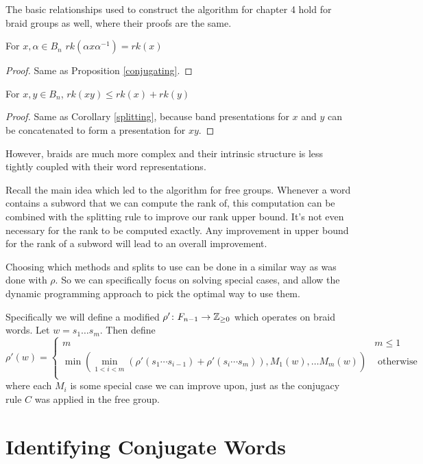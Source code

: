 \documentclass[12pt]{thesis}
\begin{document}
The basic relationships used to construct the algorithm for chapter 4 hold for braid
groups as well, where their proofs are the same.
\begin{proposition}
    For $x, \alpha \in B_{n}$
         $rk(\alpha x \alpha^{-1}) = rk(x)$   
\end{proposition}
\begin{proof}
 Same as Proposition \ref{conjugating}.
\end{proof}
\begin{proposition}
    For $x, y \in B_{n}$,
    $rk(xy) \leq rk(x) + rk(y)$ 
\end{proposition}
\begin{proof}
  Same as Corollary \ref{splitting},
 because band presentations for $x$ and $y$
can be concatenated to form a presentation for $xy$.
\end{proof}
However, braids are much more complex and their intrinsic structure
is less tightly coupled with their word representations.

Recall the main idea which led to the algorithm for free groups.
Whenever a word contains a subword that we can compute the rank of,
this computation can be combined with the splitting rule to improve
our rank upper bound.
It's not even necessary for the rank to be computed exactly.
Any improvement in upper bound for the rank of a subword  will lead
to an overall improvement.
 
Choosing which methods and splits to use
can be done in a similar way as was done with $\rho$.
So we can specifically focus on solving special cases,
and allow the dynamic programming approach to pick the optimal
way to use them.

Specifically we will define a modified $\rho' \colon F_{n-1} \rightarrow \mathbb{Z}_{\geq 0}$ which operates
on braid words.
Let $w = s_{1} \ldots s_{m}$. Then define
\begin{equation}
\rho'(w) =
\begin{cases}
    m & m \leq 1 \\
    \min( \min_{1< i < m} ( \rho'(s_{1} \cdots s_{i - 1}) + \rho'(s_{i} \cdots s_{m}) ), M_{1}(w), \ldots M_{m}(w)) &  \text{ otherwise } \\
\end{cases}
\end{equation}
where each $M_{i}$ is some special
case we can improve upon, just as the conjugacy rule $C$ was applied in the free group.

\section{Identifying Conjugate Words}
\end{document}
